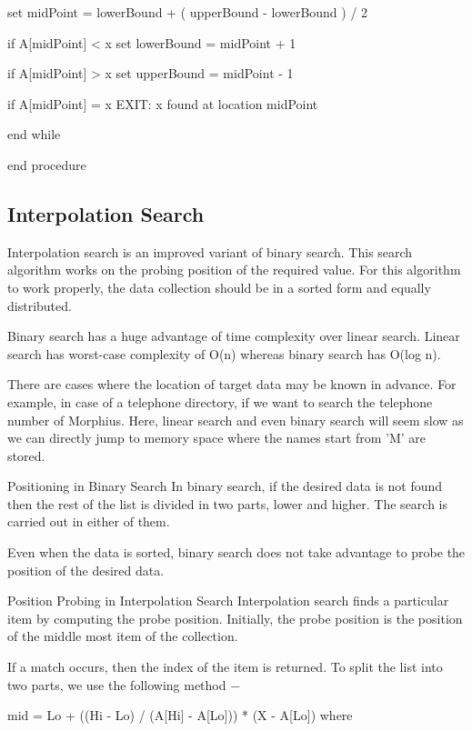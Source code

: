       set midPoint = lowerBound + ( upperBound - lowerBound ) / 2

      if A[midPoint] < x
         set lowerBound = midPoint + 1

      if A[midPoint] > x
         set upperBound = midPoint - 1

      if A[midPoint] = x
         EXIT: x found at location midPoint

   end while

end procedure

\subsection{Interpolation Search}

Interpolation search is an improved variant of binary search. This search algorithm works on the probing position of the required value. For this algorithm to work properly, the data collection should be in a sorted form and equally distributed.

Binary search has a huge advantage of time complexity over linear search. Linear search has worst-case complexity of Ο(n) whereas binary search has Ο(log n).

There are cases where the location of target data may be known in advance. For example, in case of a telephone directory, if we want to search the telephone number of Morphius. Here, linear search and even binary search will seem slow as we can directly jump to memory space where the names start from 'M' are stored.

Positioning in Binary Search
In binary search, if the desired data is not found then the rest of the list is divided in two parts, lower and higher. The search is carried out in either of them.



Even when the data is sorted, binary search does not take advantage to probe the position of the desired data.

Position Probing in Interpolation Search
Interpolation search finds a particular item by computing the probe position. Initially, the probe position is the position of the middle most item of the collection.



If a match occurs, then the index of the item is returned. To split the list into two parts, we use the following method −

mid = Lo + ((Hi - Lo) / (A[Hi] - A[Lo])) * (X - A[Lo])
where

